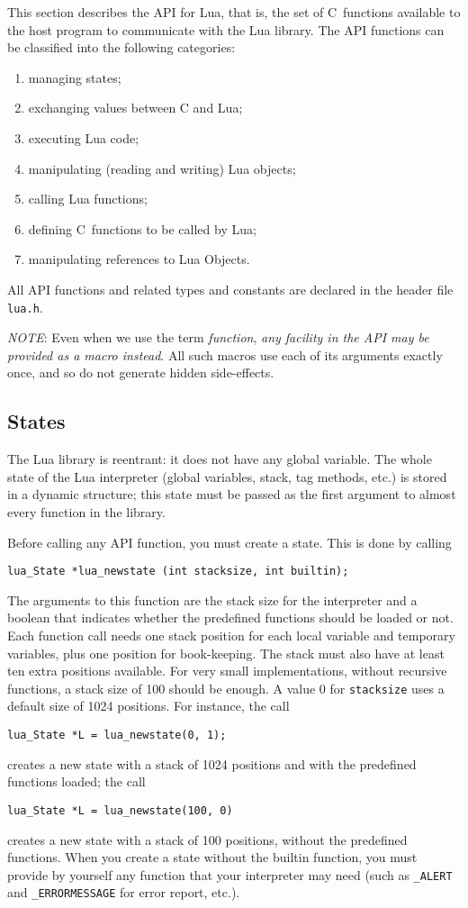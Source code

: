 \documentclass[11pt]{article}
\newcommand{\Deffunc}[1]{\index{#1}}
\newcommand{\NOTE}{\par\noindent\emph{NOTE}: }
\begin{document}
This section describes the API for Lua, that is,
the set of C~functions available to the host program to communicate
with the Lua library.
The API functions can be classified into the following categories:
\begin{enumerate}
\item managing states;
\item exchanging values between C and Lua;
\item executing Lua code;
\item manipulating (reading and writing) Lua objects;
\item calling Lua functions;
\item defining C~functions to be called by Lua;
\item manipulating references to Lua Objects.
\end{enumerate}
All API functions and related types and constants
are declared in the header file \verb|lua.h|.

\NOTE
Even when we use the term \emph{function},
\emph{any facility in the API may be provided as a macro instead}.
All such macros use each of its arguments exactly once,
and so do not generate hidden side-effects.


\subsection{States} \label{mangstate}

The Lua library is reentrant:
it does not have any global variable.
The whole state of the Lua interpreter
(global variables, stack, tag methods, etc.)
is stored in a dynamic structure; \Deffunc{lua_State}
this state must be passed as the first argument to almost
every function in the library.

Before calling any API function,
you must create a state.
This is done by calling\Deffunc{lua_newstate}
\begin{verbatim}
lua_State *lua_newstate (int stacksize, int builtin);
\end{verbatim}
The arguments to this function are
the stack size for the interpreter and a boolean that
indicates whether the predefined functions should be loaded or not.
Each function call needs one stack position for each local variable
and temporary variables, plus one position for book-keeping.
The stack must also have at least ten extra positions available.
For very small implementations, without recursive functions,
a stack size of 100 should be enough.
A value 0 for \verb|stacksize| uses a default size of 1024 positions.
For instance, the call
\begin{verbatim}
lua_State *L = lua_newstate(0, 1);
\end{verbatim}
creates a new state with a stack of 1024 positions
and with the predefined functions loaded;
the call
\begin{verbatim}
lua_State *L = lua_newstate(100, 0)
\end{verbatim}
creates a new state with a stack of 100 positions,
without the predefined functions.
When you create a state without the builtin function,
you must provide by yourself any function that your interpreter may need
(such as \verb|_ALERT| and \verb|_ERRORMESSAGE| for error report, etc.).
\end{document}
